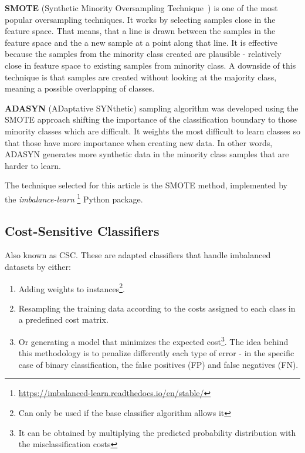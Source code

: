 \textbf{SMOTE}\label{smote} (Synthetic Minority Oversampling 
Technique~\cite{ChawlaBHK02}) is one of the most popular oversampling techniques. 
It works by selecting samples close in the feature space. That means, that a 
line is drawn between the samples in the feature space and the a new sample at a
point along that line. It is effective because the samples from the minority 
class created are plausible - relatively close in feature space to existing 
samples from minority class. A downside of this technique is that samples are 
created without looking at the majority class, meaning a possible overlapping of 
classes.

\textbf{ADASYN} (ADaptative SYNthetic) sampling algorithm was developed using 
the SMOTE approach shifting the importance of the classification boundary to 
those minority classes which are difficult. It weights the most difficult to 
learn classes so that those have more importance when creating new data. In 
other words, ADASYN generates more synthetic data in the minority class samples 
that are harder to learn.

The technique selected for this article is the SMOTE method, implemented by the 
\textit{imbalance-learn}
\footnote{\url{https://imbalanced-learn.readthedocs.io/en/stable/}} Python 
package.

\subsection{Cost-Sensitive Classifiers}\label{subsec:costSensitive}

Also known as CSC. These are adapted classifiers that handle imbalanced 
datasets by either:

\begin{enumerate}
    \item Adding weights to instances\footnote{Can only be used if the base 
    classifier algorithm allows it}.
    \item Resampling the training data according to the costs assigned to each 
    class in a predefined cost matrix.
    \item Or generating a model that minimizes the expected cost\footnote{It can 
	be obtained by multiplying the predicted probability distribution with the 
	misclassification costs}. The idea behind this methodology is to penalize 
	differently each type of error - in the specific case of binary 
	classification, the false positives (FP) and false negatives (FN).
\end{enumerate}

